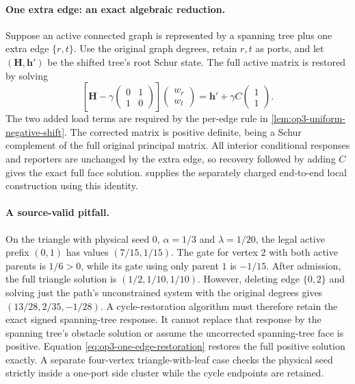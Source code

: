 \paragraph{One extra edge: an exact algebraic reduction.}
Suppose an active connected graph is represented by a spanning tree plus
one extra edge $\{r,t\}$. Use the original graph degrees, retain $r,t$ as
ports, and let $(\boldsymbol H,\boldsymbol h')$ be the shifted tree's root
Schur state. The full active matrix is restored by solving
\begin{equation}
 \left[\boldsymbol H-\gamma
   \begin{pmatrix}0&1\\1&0\end{pmatrix}\right]
 \begin{pmatrix}w_r\\w_t\end{pmatrix}
 =\boldsymbol h'+\gamma C\begin{pmatrix}1\\1\end{pmatrix}.
 \label{eq:op3-one-edge-restoration}
\end{equation}
The two added load terms are required by the per-edge rule in
\cref{lem:op3-uniform-negative-shift}. The corrected matrix is positive
definite, being a Schur complement of the full original principal matrix.
All interior conditional responses and reporters are unchanged by the extra
edge, so recovery followed by adding $C$ gives the exact full face solution.
 supplies the separately charged end-to-end
local construction using this identity.

\paragraph{A source-valid pitfall.}
On the triangle with physical seed $0$, $\alpha=1/3$ and $\lambda=1/20$,
the legal active prefix $(0,1)$ has values $(7/15,1/15)$. The gate for vertex
$2$ with both active parents is $1/6>0$, while its gate using only parent
$1$ is $-1/15$. After admission, the full triangle solution is
$(1/2,1/10,1/10)$. However, deleting edge $\{0,2\}$ and solving just the
path's unconstrained system with the original degrees gives
$(13/28,2/35,-1/28)$.
A cycle-restoration algorithm must therefore retain the exact signed
spanning-tree response. It cannot replace that response by the spanning
tree's obstacle solution or assume the uncorrected spanning-tree face is
positive. Equation \eqref{eq:op3-one-edge-restoration} restores the full
positive solution exactly. A separate four-vertex triangle-with-leaf case
checks the physical seed strictly inside a one-port side cluster while the
cycle endpoints are retained.

